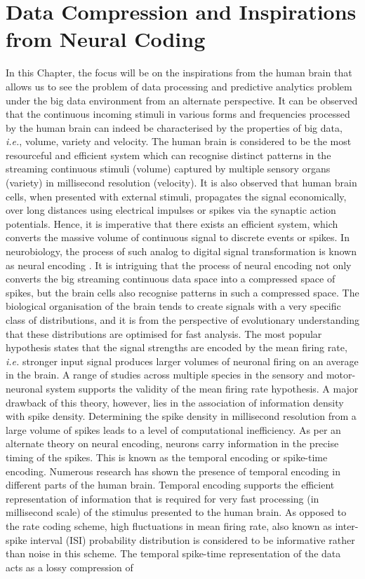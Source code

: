 \section{Data Compression and Inspirations from Neural Coding}
In this Chapter, the focus will be on the inspirations from the human brain that allows us to see the problem of data processing and predictive analytics problem under the big data environment from an alternate perspective. It can be observed that the continuous incoming stimuli in various forms and frequencies processed by the human brain can indeed be characterised by the properties of big data, \emph{i.e.}, volume, variety and velocity. The human brain is considered to be the most resourceful and efficient system which can recognise distinct patterns in the streaming continuous stimuli (volume) captured by multiple sensory organs (variety) in millisecond resolution (velocity). It is also observed that human brain cells, when presented with external stimuli, propagates the signal economically, over long distances using electrical impulses or spikes via the synaptic action potentials. Hence, it is imperative that there exists an efficient system, which converts the massive volume of continuous signal to discrete events or spikes. In neurobiology, the process of such analog to digital signal transformation is known as neural encoding \citep{brown2004multiple}. It is intriguing that the process of neural encoding not only converts the big streaming continuous data space into a compressed space of spikes, but the brain cells also recognise patterns in such a compressed space. The biological organisation of the brain tends to create signals with a very specific class of distributions, and it is from the perspective of evolutionary understanding that these distributions are optimised for fast analysis. The most popular hypothesis states that the signal strengths are encoded by the mean firing rate, \emph{i.e.} stronger input signal produces larger volumes of neuronal firing on an average in the brain. A range of studies \citep{mainen1995reliability, maunsell1992visual} across multiple species in the sensory and motor-neuronal system supports the validity of the mean firing rate hypothesis. A major drawback of this theory, however, lies in the association of information density with spike density. Determining the spike density in millisecond resolution from a large volume of spikes leads to a level of computational inefficiency. As per an alternate theory on neural encoding, neurons carry information in the precise timing of the spikes. This is known as the temporal encoding or spike-time encoding. Numerous research \citep{gollisch2008rapid,hallock2006temporal} has shown the presence of temporal encoding in different parts of the human brain. Temporal encoding supports the efficient representation of information that is required for very fast processing (in millisecond scale) of the stimulus presented to the human brain. As opposed to the rate coding scheme, high fluctuations in mean firing rate, also known as inter-spike interval (ISI) probability distribution is considered to be informative rather than noise in this scheme. The temporal spike-time representation of the data acts as a lossy compression of 